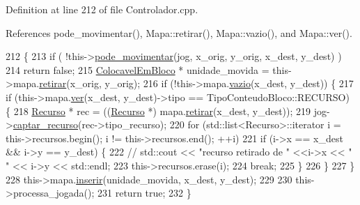 Definition at line 212 of file Controlador.\+cpp.



References pode\+\_\+movimentar(), Mapa\+::retirar(), Mapa\+::vazio(), and Mapa\+::ver().


\begin{DoxyCode}
212                                                                                                            
                               \{
213     \textcolor{keywordflow}{if} ( !this->\mbox{\hyperlink{class_controlador_a75328c4987fa242b36531edac623ff3e}{pode\_movimentar}}(jog, x\_orig, y\_orig, x\_dest, y\_dest) )
214         \textcolor{keywordflow}{return} \textcolor{keyword}{false};
215     \mbox{\hyperlink{class_colocavel_em_bloco}{ColocavelEmBloco}} * unidade\_movida = this->mapa.\mbox{\hyperlink{class_mapa_a8c216da0fb1514cb354c40b64d9af93a}{retirar}}(x\_orig, y\_orig);
216     \textcolor{keywordflow}{if} (!this->mapa.\mbox{\hyperlink{class_mapa_a5bdde997d3c97c5b6fb7d37c124cdf93}{vazio}}(x\_dest, y\_dest)) \{
217         \textcolor{keywordflow}{if} (this->mapa.\mbox{\hyperlink{class_mapa_a52dbdf40a47afb56b1cb35dd1cb552f5}{ver}}(x\_dest, y\_dest)->tipo == TipoConteudoBloco::RECURSO) \{
218             \mbox{\hyperlink{class_recurso}{Recurso}} * rec = ((\mbox{\hyperlink{class_recurso}{Recurso}} *) mapa.\mbox{\hyperlink{class_mapa_a8c216da0fb1514cb354c40b64d9af93a}{retirar}}(x\_dest, y\_dest));
219             jog->\mbox{\hyperlink{class_player_a66d2bc18dfc9b913109761a95126f086}{captar\_recurso}}(rec->tipo\_recurso);
220             \textcolor{keywordflow}{for} (std::list<Recurso>::iterator i = this->recursos.begin(); i != this->recursos.end(); ++i)
221                 \textcolor{keywordflow}{if} (i->x == x\_dest && i->y == y\_dest) \{
222 \textcolor{comment}{// std::cout << "recurso retirado de  " <<i->x << " " << i->y << std::endl;}
223                     this->recursos.erase(i);
224                     \textcolor{keywordflow}{break};
225                 \}
226         \}
227     \}
228     this->mapa.\mbox{\hyperlink{class_mapa_a4dbab5cd3008b39687d8d2edb0ebacee}{inserir}}(unidade\_movida, x\_dest, y\_dest);
229 
230     this->processa\_jogada();
231     \textcolor{keywordflow}{return} \textcolor{keyword}{true};
232 \}
\end{DoxyCode}
\mbox{\label{class_controlador_a89652e27b5fc06fa0489e6bae0328d33}} 
